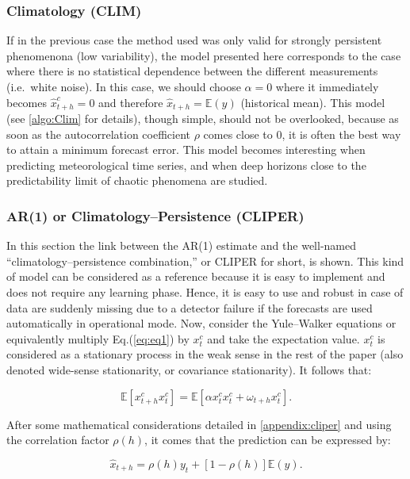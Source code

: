 \subsubsection{Climatology \textnormal{(CLIM)}}
\label{sec:subsec2}
If in the previous case the method used was only valid for strongly persistent phenomenona (low variability), the model presented here corresponds to the case where there is no statistical dependence between the different measurements (i.e.\ white noise). In this case, we should choose $\alpha= 0$ where it immediately becomes $\widehat{x}^c_{t+h}=0$ and therefore $\widehat{x}_{t+h}^{\,}=\mathbb{E}(y)$ (historical mean). This model (see \ref{algo:Clim} for details), though simple, should not be overlooked, because as soon as the autocorrelation coefficient $\rho$ comes close to 0, it is often the best way to attain a minimum forecast error. This model becomes interesting when predicting meteorological time series, and when deep horizons close to the predictability limit of chaotic phenomena are studied. 

\subsubsection{\textnormal{AR(1)} or Climatology--Persistence \textnormal{(CLIPER)}}
\label{sec:AR}
In this section the link between the AR(1) estimate and the well-named ``climatology--persistence combination,'' or CLIPER for short, is shown. This kind of model can be considered as a reference because it is easy to implement and does not require any learning phase. Hence, it is easy to use and robust in case of data are suddenly missing due to a detector failure if the forecasts are used automatically in operational mode. Now, consider the Yule--Walker equations \citep{175742} or equivalently multiply Eq.(\ref{eq:eq1}) by $x^c_t$ and take the expectation value. $x^c_t$ is considered as a stationary process in the weak sense in the rest of the paper (also denoted wide-sense stationarity, or covariance stationarity). It follows that:

\begin{equation}
\label{eq:eq4bis}
\mathbb{E}[x^c_{t+h}x^c_{t}]=\mathbb{E}[\alpha x^c_tx^c_t+\omega_{t+h}x^c_t].
\end{equation}

After some mathematical considerations detailed in \ref{appendix:cliper} and using the correlation factor $\rho(h)$, it comes that the prediction can be expressed by:

\begin{equation}
\label{eq:CLIPER}
\widehat{x}_{t+h}=\rho(h)y_t+\left[1-\rho(h)\right]\mathbb{E}(y).
\end{equation}

